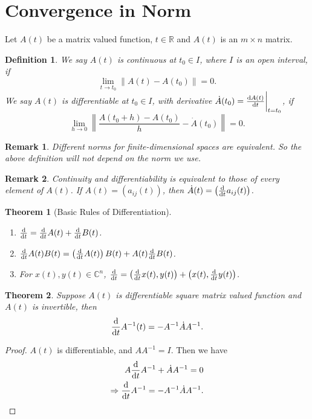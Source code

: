 \documentclass[11pt]{book}
\newtheorem{definition}{Definition}[section]
\newtheorem{theorem}{Theorem}[section]
\newtheorem{remark}{Remark}[section]
\theoremstyle{definition}
\numberwithin{equation}{subsection}
\begin{document}
\section{Convergence in Norm}

Let $A(t)$ be a matrix valued function, $t\in\mathbb{R}$ and $A(t)$ is an $m\times n$ matrix. 

\begin{definition}
We say $A(t)$ is continuous at $t_0\in I$, where $I$ is an open interval, if 
$$\lim_{t\to t_0}\left\|A(t) - A(t_0)\right\| = 0.$$
We say $A(t)$ is differentiable at $t_0\in I$, with derivative $\dot{A}(t_0) = \dv{A(t)}{t}\bigg|_{t=t_0}$, if 
$$\lim_{h\to 0}\left\|\frac{A(t_0+h) - A(t_0)}{h} - \dot{A}(t_0)\right\| = 0.$$
\end{definition}

\begin{remark}
Different norms for finite-dimensional spaces are equivalent. So
the above definition will not depend on the norm we use.
\end{remark}

\begin{remark}
Continuity and differentiability is equivalent to those of every element of $A(t)$. If $A(t) = \left(a_{ij}(t) \right)$, then $\dot{A}(t) = \left(\dv{}{t}a_{ij}(t)\right)$.
\end{remark}

\medskip

\begin{theorem}[Basic Rules of Differentiation]
~\begin{enumerate}[label=(\roman*)]
    \item $\dv{}{t}(A(t)+B(t)) = \dv{}{t}A(t) + \dv{}{t}B(t)$.
    \item $\dv{}{t} A(t)B(t) = \left(\dv{}{t} A(t)\right) B(t) + A(t) \dv{}{t} B(t)$.
    \item For $x(t),y(t) \in \mathbb{C}^n$, $\dv{}{t}(x(t), y(t)) = \left(\dv{}{t}x(t), y(t)\right) + \left(x(t), \dv{}{t} y(t) \right)$.
\end{enumerate}
\end{theorem}

\medskip

\begin{theorem}
Suppose $A(t)$ is differentiable square matrix valued function and $A(t)$ is invertible, then
\begin{align*}
    \dv{}{t}A^{-1}(t) = - A^{-1} \dot{A} A^{-1}.
\end{align*}
\end{theorem}
\begin{proof}
$A(t)$ is differentiable, and $AA^{-1} = I$. Then we have
\begin{align*}
    A \dv{}{t}A^{-1} + \dot{A} A^{-1} = 0 \\
    \Rightarrow \dv{}{t}A^{-1} = - A^{-1} \dot{A} A^{-1}.
\end{align*}
\end{proof}
\end{document}
